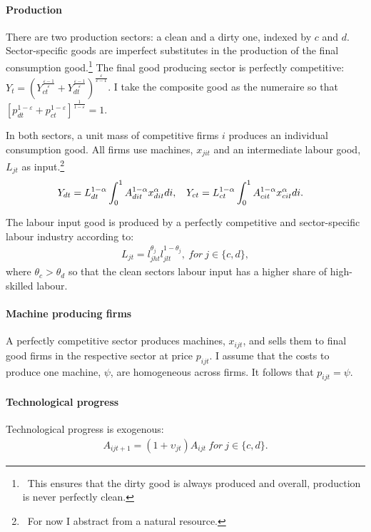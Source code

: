 \paragraph{Production}
There are two production sectors: a clean and a dirty one, indexed by $c$ and $d$. Sector-specific goods are imperfect substitutes in the production of the final consumption good.\footnote{\ This ensures that the dirty good is always produced and overall, production is never perfectly clean.}  
The final good producing sector is perfectly competitive:
$Y_t=\left(Y_{ct}^{\frac{\varepsilon-1}{\varepsilon}}+Y_{dt}^{\frac{\varepsilon-1}{\varepsilon}}\right)^\frac{\varepsilon}{\varepsilon-1}$. 
I take the composite good as the numeraire so that $\left[p_{dt}^{1-\varepsilon}+p_{ct}^{1-\varepsilon}\right]^{\frac{1}{1-\varepsilon}}=1$.

In both sectors, a unit mass of competitive firms $i$ produces an individual consumption good. All firms use machines, $x_{jit}$ and an intermediate labour good, $L_{jt}$ as input.\footnote{\ For now I abstract from a natural resource.} 
\begin{align*}
&Y_{dt}= L_{dt}^{1-\alpha}\int_{0}^{1}A_{dit}^{1-\alpha}x_{dit}^{\alpha} di,\ \hspace{2mm} Y_{ct}= L_{ct}^{1-\alpha}\int_{0}^{1}A_{cit}^{1-\alpha}x_{cit}^{\alpha} di.
\end{align*}

The labour input good is produced by a perfectly competitive and sector-specific labour industry according to: 
\begin{align}
L_{jt}=l_{jht}^{\theta_j}l_{jlt}^{1-\theta_j}, \ for \ j \in\{c,d\},
\end{align}
where $\theta_c>\theta_d$ so that the clean sectors labour input has a higher share of high-skilled labour. 


\paragraph{Machine producing firms}
A perfectly competitive sector produces machines, $x_{ijt}$, and sells them to final good firms in the respective sector at price $p_{ijt}$. I assume that the costs to produce one machine, $\psi$, are homogeneous across firms. It follows that $p_{ijt}=\psi$.


\paragraph{Technological progress}
Technological progress is exogenous:
\begin{align}
A_{ijt+1}=(1+\upsilon_{jt}) A_{ijt}\ for \ j \in\{c,d\}. 
\end{align}

